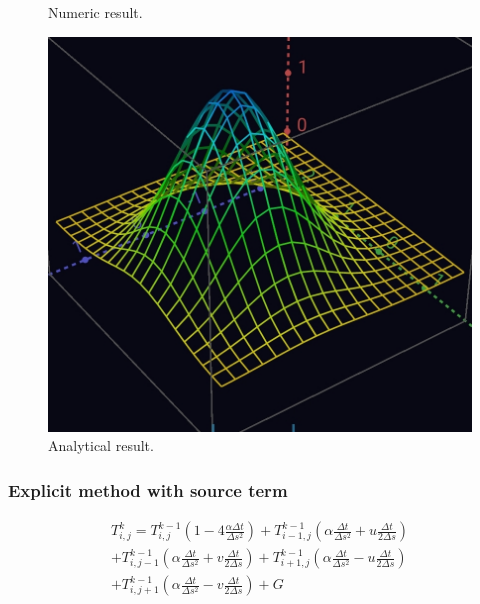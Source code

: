 \documentclass[xcolor=dvipsnames,10pt,aspectratio=169]{beamer}
\begin{document}
\begin{frame}
\begin{minipage}[h!]{0.17\textwidth}
\begin{figure}[h!]
			\caption{Numeric result.}
		\end{figure}
		\begin{figure}[h!]
			\centering
			\includegraphics[trim = {0cm 0cm 0cm 0cm}, clip , angle=0, scale=0.07]{figuras/resultado_analitico}
			\caption{Analytical result.}
		\end{figure}
	\end{minipage}
\end{frame}

\begin{frame}
	\frametitle{Explicit method with source term}
	\begin{equation}
		\begin{split}
		T_{i,j}^{k} = T_{i,j}^{k-1} \left( 1 - 4 \frac{\alpha \Delta t}{\Delta s ^2}\right) + T_{i -1, j}^{k-1} \left( \alpha \frac{\Delta t}{\Delta s^2} + u \frac{\Delta t}{2 \Delta s} \right)\\
		+ T_{i,j-1}^{k-1} \left( \alpha \frac{\Delta t}{\Delta s^2} + v \frac{\Delta t}{2 \Delta s} \right) +  T_{i+1,j}^{k-1} \left( \alpha \frac{\Delta t}{ \Delta s^2} - u \frac{\Delta t}{2 \Delta s}\right) \\
		+  T_{i,j+1}^{k-1} \left( \alpha \frac{\Delta t}{\Delta s^2} - v \frac{\Delta t}{2 \Delta s}\right) + G
		\end{split}
	\end{equation}
\end{frame}
\end{document}
